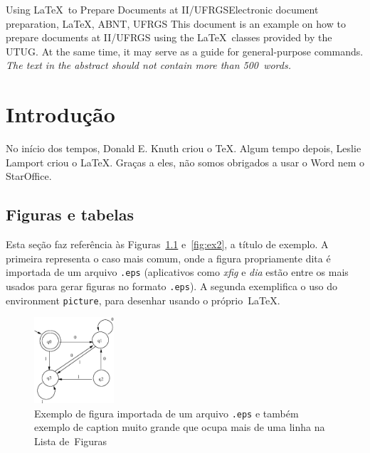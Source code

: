 \documentclass[ti]{iiufrgs}
\begin{document}
\begin{englishabstract}{Using \LaTeX\ to Prepare Documents at II/UFRGS}{Electronic document preparation, \LaTeX, ABNT, UFRGS}
This document is an example on how to prepare documents at II/UFRGS
using the \LaTeX\ classes provided by the UTUG\@. At the same time, it
may serve as a guide for general-purpose commands. \emph{The text in
the abstract should not contain more than 500~words.}
\end{englishabstract}


\chapter{Introdução}
No início dos tempos, Donald E. Knuth criou o \TeX. Algum tempo depois, Leslie Lamport criou o \LaTeX. Graças a eles, não somos obrigados a usar o Word nem o StarOffice.

\section{Figuras e tabelas}
Esta seção faz referência às Figuras~\ref{fig:ex1} e~\ref{fig:ex2}, a título de exemplo. A primeira representa o caso mais comum, onde a figura propriamente dita é importada de um arquivo \texttt{.eps} (aplicativos como \emph{xfig} e \emph{dia} estão entre os mais usados para gerar figuras no formato \texttt{.eps}). A segunda exemplifica o uso do environment \texttt{picture}, para desenhar usando o próprio~\LaTeX.

\begin{figure}
        \centerline{\includegraphics[width=8em]{fig.eps}}
        \caption{Exemplo de figura importada de um arquivo \texttt{.eps} e também exemplo de caption muito grande que ocupa mais de uma linha na Lista de~Figuras}
        \label{fig:ex1}
\end{figure}
\end{document}
